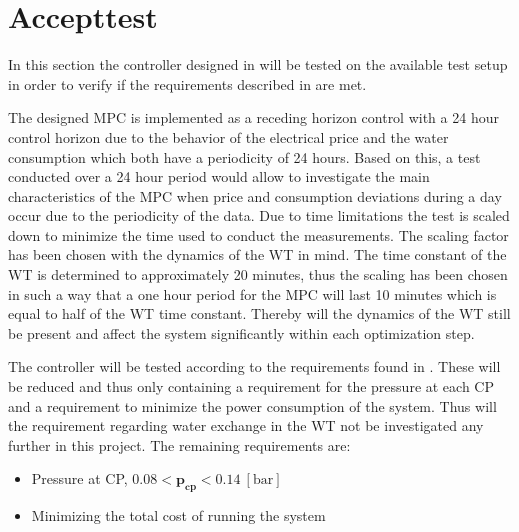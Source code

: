 \chapter{Accepttest}
\label{accepttest}

In this section the controller designed in  will be tested on the available test setup in order to verify if the requirements described in  are met. 

The designed MPC is implemented as a receding horizon control with a 24 hour control horizon due to the behavior of the electrical price and the water consumption which both have a periodicity of 24 hours. 
Based on this, a test conducted over a 24 hour period would allow to investigate the main characteristics of the MPC when price and consumption deviations during a day occur due to the periodicity of the data.   
Due to time limitations the test is scaled down to minimize the time used to conduct the measurements. 
The scaling factor has been chosen with the dynamics of the WT in mind. 
The time constant of the WT is determined to approximately 20 minutes, thus the scaling has been chosen in such a way that a one hour period for the MPC will last 10 minutes which is equal to half of the WT time constant. 
Thereby will the dynamics of the WT still be present and affect the system significantly within each optimization step.

The controller will be tested according to the requirements found in . These will be reduced and thus only containing a requirement for the pressure at each CP and a requirement to minimize the power consumption of the system. Thus will the requirement regarding water exchange in the WT not be investigated any further in this project. The remaining requirements are: 


\begin{itemize}
	\item Pressure at CP, $0.08 < \pmb{p_{cp}} < 0.14 \:[\text{bar}]$
%
	\item Minimizing the total cost of running the system
\end{itemize}    